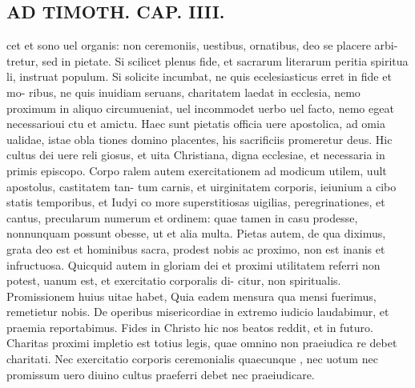 \documentclass{article}
\begin{document}
\begin{pages}
\section*{AD TIMOTH. CAP. IIII. }
\marginpar{[ p.509 ]}\pstart cet et sono uel organis: non ceremoniis, uestibus, ornatibus, deo se placere arbi- tretur, sed in pietate. Si scilicet plenus fide, et sacrarum literarum peritia spiritua li, instruat populum. Si solicite incumbat, ne quis ecelesiasticus erret in fide et mo- ribus, ne quis inuidiam seruans, charitatem laedat in ecclesia, nemo proximum in aliquo circumueniat, uel incommodet uerbo uel facto, nemo egeat necessarioui ctu et amictu. Haec sunt pietatis officia uere apostolica, ad omia ualidae, istae obla tiones domino placentes, his sacrificiis promeretur deus. Hic cultus dei uere reli giosus, et uita Christiana, digna ecclesiae, et necessaria in primis episcopo. Corpo ralem autem exercitationem ad modicum utilem, uult apostolus, castitatem tan- tum carnis, et uirginitatem corporis, ieiunium a cibo statis temporibus, et Iudyi co more superstitiosas uigilias, peregrinationes, et cantus, precularum numerum et ordinem: quae tamen in casu prodesse, nonnunquam possunt obesse, ut et alia multa. Pietas autem, de qua diximus, grata deo est et hominibus sacra, prodest nobis ac proximo, non est inanis et infructuosa. Quicquid autem in gloriam dei et proximi utilitatem referri non potest, uanum est, et exercitatio corporalis di- citur, non spiritualis. Promissionem huius uitae habet, Quia eadem mensura qua mensi fuerimus, remetietur nobis. De operibus misericordiae in extremo iudicio laudabimur, et praemia reportabimus. Fides in Christo hic nos beatos reddit, et in futuro. Charitas proximi impletio est totius legis, quae omnino non praeiudica re debet charitati. Nec exercitatio corporis ceremonialis quaecunque , nec uotum nec promissum uero diuino cultus praeferri debet nec praeiudicare.  \pend
{}
{}

\end{pages}
\end{document}
